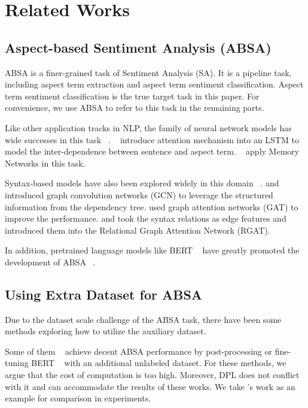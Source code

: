\documentclass[11pt]{article}
\begin{document}
\section{Related Works}
\subsection{Aspect-based Sentiment Analysis (ABSA)}
ABSA is a finer-grained task of Sentiment Analysis (SA). 
It is a pipeline task, including aspect term extraction and aspect term sentiment classification. 
Aspect term sentiment classification is the true target task in this paper.
For convenience, we use ABSA to refer to this task in the remaining parts.


Like other application tracks in NLP, the family of neural network models has wide successes in this task ~\cite{jiang2011target,vo2015target,zhang2016gated,ma2017interactive,li2018hierarchical,wang2018target,huang2018aspect,song2019attentional}.
~\citet{wang2016attention} introduce attention mechanism into an LSTM to model the inter-dependence between sentence and aspect term. 
~\citet{tang2016aspect} apply Memory Networks in this task.

Syntax-based models have also been explored widely in this domain ~\cite{dong2014adaptive,tai2015improved,nguyen2015phrasernn,liu2020jointly,li2021dual,pang2021dynamic}.
\citet{sun2019aspect} and \citet{zhang2019aspect} introduced graph convolution networks (GCN) to leverage the structured information from the dependency tree.
\citet{huang2019syntax} used graph attention networks (GAT) to improve the performance.
\citet{bai2020investigating} and \citet{wang2020relational} took the syntax relations as edge features and introduced them into the Relational Graph Attention Network (RGAT). 

In addition, pretrained language models like BERT ~\cite{devlin2018bert} have greatly promoted the development of ABSA ~\cite{li2018hierarchical,gao2019target,song2019attentional,rietzler2019adapt,yang2019multi}.


\subsection{Using Extra Dataset for ABSA}
Due to the dataset scale challenge of the ABSA task, there have been some methods exploring how to utilize the auxiliary dataset.

Some of them ~\cite{xu2019bert,rietzler2019adapt,yu2021cross} achieve decent ABSA performance by post-processing or fine-tuning BERT ~\cite{devlin2018bert} with an additional unlabeled dataset.
For these methods, we argue that the cost of computation is too high. Moreover, DPL does not conflict with it and can accommodate the results of these works. We take \citet{rietzler2019adapt}'s work as an example for comparison in experiments.
\end{document}
